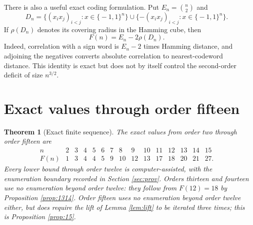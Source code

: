 \documentclass[11pt]{article}
\newcommand{\eps}{\{\!-1,1\!\}}
\newtheorem{theorem}{Theorem}[section]
\theoremstyle{remark}
\begin{document}
There is also a useful exact coding formulation.  Put $E_n=\binom n2$ and
\[
 D_n=\{(x_ix_j)_{i<j}:x\in\eps^n\}
      \cup\{-(x_ix_j)_{i<j}:x\in\eps^n\}.
\]
If $\rho(D_n)$ denotes its covering radius in the Hamming cube, then
\begin{equation}
 F(n)=E_n-2\rho(D_n).                                      \label{eq:cover}
\end{equation}
Indeed, correlation with a sign word is $E_n-2$ times Hamming distance, and
adjoining the negatives converts absolute correlation to nearest-codeword
distance.  This identity is exact but does not by itself control the
second-order deficit of size $n^{3/2}$.

\section{Exact values through order fifteen}

\begin{theorem}[Exact finite sequence]
The exact values from order two through order fifteen are
\[
\begin{array}{c|rrrrrrrrrrrrrr}
n&2&3&4&5&6&7&8&9&10&11&12&13&14&15\\ \hline
F(n)&1&3&4&4&5&9&10&12&13&17&18&20&21&27.
\end{array}
\]
Every lower bound through order twelve is computer-assisted, with the
enumeration boundary recorded in Section \ref{sec:prov}.  Orders thirteen and
fourteen use no enumeration beyond order twelve: they follow from $F(12)=18$
by Proposition \ref{prop:1314}.  Order fifteen uses no enumeration beyond
order twelve either, but does require the lift of Lemma \ref{lem:lift} to be
iterated three times; this is Proposition \ref{prop:15}.
\end{theorem}
\end{document}
